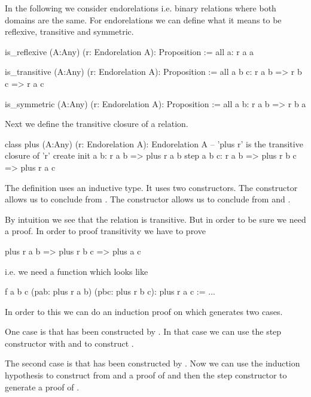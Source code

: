 In the following we consider endorelations i.e. binary relations where both
domains are the same. For endorelations we can define what it means to be
reflexive, transitive and symmetric.

\begin{alba}
  is_reflexive (A:Any) (r: Endorelation A): Proposition :=
    all a: r a a

  is_transitive (A:Any) (r: Endorelation A): Proposition :=
    all a b c: r a b => r b c => r a c

  is_symmetric (A:Any) (r: Endorelation A): Proposition :=
    all a b: r a b => r b a
\end{alba}


Next we define the transitive closure of a relation.

\begin{alba}
  class
    plus (A:Any) (r: Endorelation A): Endorelation A
      -- 'plus r' is the transitive closure of 'r'
  create
    init a b:
      r a b
      => plus r a b
    step a b c:
      r a b
      => plus r b c
      => plus r a c
\end{alba}

The definition uses an inductive type. It uses two constructors. The
 constructor allows us to conclude  from .
The  constructor allows us to conclude  from
 and .

By intuition we see that the relation  is transitive. But in
order to be sure we need a proof. In order to proof transitivity we have to
prove
%
\begin{alba}
  plus r a b => plus r b c => plus a c
\end{alba}
%
i.e. we need a function which looks like
%
\begin{alba}
  f a b c (pab: plus r a b) (pbc: plus r b c): plus r a c :=
    ...
\end{alba}
%
In order to this we can do an induction proof on  which
generates two cases.

One case is that  has been constructed
by . In that case we can use the step constructor with
 and  to construct .

The second case is that   has been constructed by . Now we can use the induction
hypothesis to construct from  and  a proof of  and then the step constructor to generate a proof of .


